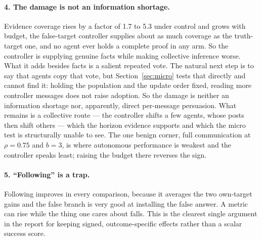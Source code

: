 \documentclass[11pt]{article}
\begin{document}
\paragraph{4. The damage is not an information shortage.}
Evidence coverage rises by a factor of 1.7 to 5.3 under
control and grows with budget, the false-target controller supplies about as much coverage as
the truth-target one, and no agent ever
holds a complete proof in any arm. So the controller is supplying genuine facts while making
collective inference worse. What it adds besides facts is a salient repeated vote. The
natural next step is to say that agents copy that vote, but Section~\ref{sec:micro} tests
that directly and cannot find it: holding the population and the update order fixed, reading
more controller messages does not raise adoption. So the damage is neither an information
shortage nor, apparently, direct per-message persuasion. What remains is a collective route
--- the controller shifts a few agents, whose posts then shift others --- which the
horizon evidence supports and which the micro test is structurally unable to see. The one
benign corner, full communication at $\rho=0.75$ and $b=3$, is where autonomous performance
is weakest and the controller speaks least; raising the budget there reverses the sign.

\paragraph{5. ``Following'' is a trap.}
Following improves in every comparison, because it averages the two own-target gains and the
false branch is very good at installing the false answer. A metric can rise while the thing
one cares about falls. This is the clearest single argument in the report for keeping
signed, outcome-specific effects rather than a scalar success score.
\end{document}
